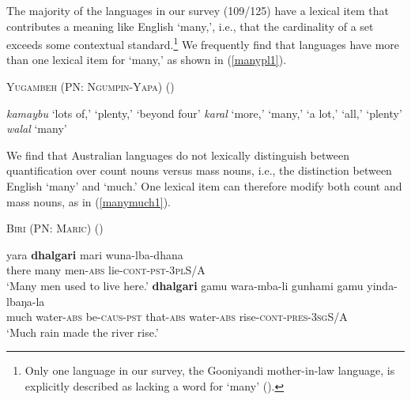 \documentclass[12pt,egregdoesnotlikesansseriftitles]{scrartcl}
\makeatletter
\newcommand{\ofy}{/125} %
\makeatother
\begin{document}
The majority of the languages in our survey (109\ofy) have a lexical item that contributes a meaning like English `many,', i.e., that the cardinality of a set exceeds some contextual standard.\footnote{Only one language in our survey, the Gooniyandi mother-in-law language, is explicitly described as lacking a word for `many' (\citealt[636]{mcgregor89}).} We frequently find that languages  have more than one lexical item for `many,' as shown in (\ref{manypl1}). %

\begin{exe}
 \ex  \textsc{Yugambeh (PN: Ngumpin-Yapa)} (\citealt{sharpe98}) \label{manypl1}
  \begin{xlist}
    \ex \textit{kamaybu} `lots of,' `plenty,' `beyond four'
    \ex \textit{karal} `more,' `many,' `a lot,' `all,' `plenty'
    \ex \textit{walal}  `many' 
  \end{xlist} 
\end{exe}

We find that Australian languages do not lexically distinguish between quantification over count nouns versus mass nouns, i.e., the distinction between English `many' and `much.' One lexical item can therefore modify both count and mass nouns, as in (\ref{manymuch1}).

\begin{exe}
\ex \textsc{Biri (PN: Maric}) (\cite[54]{terrill98}) \label{manymuch1}
\begin{xlist} 
\ex  \gll  yara    \textbf{dhalgari}    mari        wuna-lba-dhana \\
    there    many        men-\textsc{abs}    lie-\textsc{cont-pst}-3\textsc{pl}S/A \\
    `Many men used to live here.'
\ex \gll \textbf{dhalgari}    gamu        wara-mba-li        gunhami    gamu     yinda-lbaŋa-la  \\   
    much        water-\textsc{abs}    be\textsc{-caus-pst}    that-\textsc{abs}    water-\textsc{abs}  rise-\textsc{cont-pres}-3\textsc{sg}S/A\\
    `Much rain made the river rise.'
\end{xlist}
\end{exe}
\end{document}
